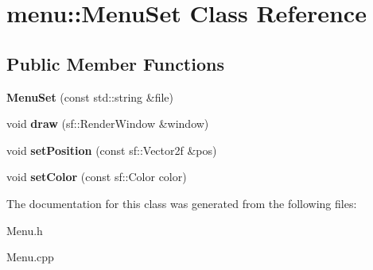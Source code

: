 \hypertarget{classmenu_1_1_menu_set}{}\section{menu\+:\+:Menu\+Set Class Reference}
\label{classmenu_1_1_menu_set}
\subsection*{Public Member Functions}
\begin{DoxyCompactItemize}
\item 
\mbox{\label{classmenu_1_1_menu_set_ab5c3e7d4860b8d3255235b702b8e2488}} 
{\bfseries Menu\+Set} (const std\+::string \&file)
\item 
\mbox{\label{classmenu_1_1_menu_set_af05fd419b9d2e95710a465f8ee35ec34}} 
void {\bfseries draw} (sf\+::\+Render\+Window \&window)
\item 
\mbox{\label{classmenu_1_1_menu_set_acec30ab4f92e60902b439833bc2e9a9d}} 
void {\bfseries set\+Position} (const sf\+::\+Vector2f \&pos)
\item 
\mbox{\label{classmenu_1_1_menu_set_a3873b2447f3d76f4e0b211e7bcca3797}} 
void {\bfseries set\+Color} (const sf\+::\+Color color)
\end{DoxyCompactItemize}


The documentation for this class was generated from the following files\+:\begin{DoxyCompactItemize}
\item 
Menu.\+h\item 
Menu.\+cpp\end{DoxyCompactItemize}
